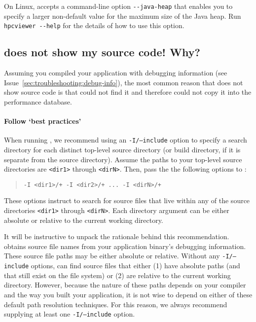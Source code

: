 \documentclass[11pt,twoside,letterpaper]{report}
\begin{document}
On Linux, \hpcviewer{} accepts a command-line option \verb|--java-heap| that enables you to specify a larger non-default value for the maximum size of the Java heap. Run \verb|hpcviewer --help| for the details of how to use this option.



\subsection{\hpcviewer{} does not show my source code! Why?}


Assuming you compiled your application with debugging information (see Issue~\ref{sec:troubleshooting:debug-info}),
the most common reason that \hpcviewer{} does not show source code is that \hpcprofAll{}
could not find it and therefore could not copy it into the \HPCToolkit{} performance database.



\paragraph{Follow `best practices'}
When running \hpcprofAll{}, we recommend using an \texttt{-I/--include} option to specify a search directory for each distinct top-level source directory (or build directory, if it is separate from the source directory).
Assume the paths to your top-level source directories are \texttt{<dir1>} through \texttt{<dirN>}.
Then, pass the the following options to \hpcprofAll{}:
\begin{quote}
  \verb|-I <dir1>/+ -I <dir2>/+ ... -I <dirN>/+|
\end{quote}
These options instruct \hpcprofAll{} to search for source files that live within any of the source directories \texttt{<dir1>} through \texttt{<dirN>}.
Each directory argument can be either absolute or relative to the current working directory.

It will be instructive to unpack the rationale behind this recommendation.
\hpcprofAll{} obtains source file names from your application binary's debugging information.
These source file paths may be either absolute or relative.
Without any \texttt{-I/--include} options, \hpcprofAll{} can find source files that either (1) have absolute paths (and that still exist on the file system) or (2) are relative to the current working directory.
However, because the nature of these paths depends on your compiler and the way you built your application, it is not wise to depend on either of these default path resolution techniques.
For this reason, we always recommend supplying at least one \texttt{-I/--include} option.
\end{document}
